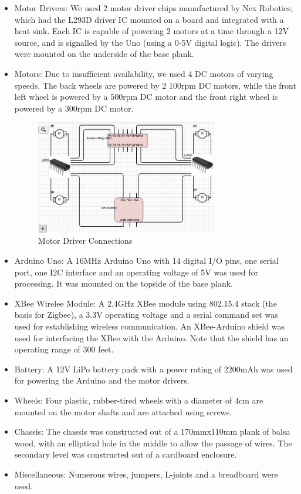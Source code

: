 \documentclass[a4paper]{article}
\begin{document}
\begin{itemize}
\item{Motor Drivers:} We used 2 motor driver chips manufactured by Nex Robotics, which had the L293D driver IC mounted on a board and integrated with a heat sink. Each IC is capable of powering 2 motors at a time through a 12V source, and is signalled by the Uno (using a 0-5V digital logic). The drivers were mounted on the underside of the base plank.

\item{Motors:} Due to insufficient availability, we used 4 DC motors of varying speeds. The back wheels are powered by 2 100rpm DC motors, while the front left wheel is powered by a 500rpm DC motor and the front right wheel is powered by a 300rpm DC motor.

\begin{figure}
\centering
\includegraphics[width=0.75\textwidth]{electric_schema.jpg}
\caption{Motor Driver Connections}
\end{figure}

\item{Arduino Uno:} A 16MHz Arduino Uno with 14 digital I/O pins, one serial port, one I2C interface and an operating voltage of 5V was used for processing. It was mounted on the topside of the base plank.

\item{XBee Wirelee Module:} A 2.4GHz XBee module using 802.15.4 stack (the basis for Zigbee), a 3.3V operating voltage and a serial command set was used for establishing wireless communication. An XBee-Arduino shield was used for interfacing the XBee with the Arduino. Note that the shield has an operating range of 300 feet.

\item{Battery:} A 12V LiPo battery pack with a power rating of 2200mAh was used for powering the Arduino and the motor drivers.

\item{Wheels:} Four plastic, rubber-tired wheels with a diameter of 4cm are mounted on the motor shafts and are attached using screws.

\item{Chassis:} The chassis was constructed out of a 170mmx110mm plank of balsa wood, with an elliptical hole in the middle to allow the passage of wires. The secondary level was constructed out of a cardboard enclosure.

\item{Miscellaneous:} Numerous wires, jumpers, L-joints and a breadboard were used.
\end{itemize}
\end{document}

